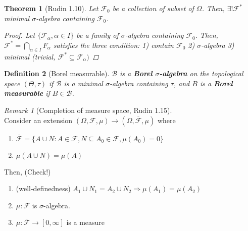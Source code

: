 \documentclass[12pt]{report}
\renewcommand{\1}{\mathbb{1}}
\renewcommand{\subset}{\subseteq}
\theoremstyle{break}
\newtheorem{thm}{Theorem}[section] %
\theoremstyle{newdef}
\newtheorem{defn}[thm]{Definition} %
\theoremstyle{remark}
\newtheorem*{rem}{Remark} %
\begin{document}
\begin{thm}[Rudin 1.10]
Let $\mathcal{F}_0$ be a collection of subset of $\Omega$.
Then, $\exists! \mathcal{F}^*$ minimal $\sigma$-algebra containing $\mathcal F_0$.

\begin{proof}
Let $\{\mathcal{F}_\alpha, \alpha \in I\}$ be a family of $\sigma$-algebra containing $\mathcal{F}_0$.
Then, $\mathcal{F}^* = \bigcap_{\alpha\in I} F_\alpha$ satisfies the three condition:
1) contain $\mathcal{F}_0$
2) $\sigma$-algebra
3) minimal (trivial, $\mathcal{F}^* \subset \mathcal{F}_\alpha)$
\end{proof}
\end{thm}


\begin{defn}[Borel measurable]
$\mathcal{B}$ is a \textbf{Borel $\sigma$-algebra} on the topological space $(\Theta,\tau)$ if
$\mathcal{B}$ is a minimal $\sigma$-algebra containing $\tau$, and $B$ is a \textbf{Borel measurable} if $B \in \mathcal{B}$.
\end{defn}

\begin{rem}[Completion of measure space, Rudin 1.15]
\leavevmode\\
Consider an extension $(\Omega, \mathcal{F}, \mu) \rightarrow (\Omega, \overline{\mathcal{F}}, \mu)$ where
\begin{enumerate}
\item $\overline{\mathcal{F}} = \{ A \cup N : A \in \mathcal{F}, N \subset A_0 \in \mathcal{F}, \mu(A_0) = 0 \}$
\item $\mu(A \cup N) = \mu(A)$
\end{enumerate}
Then, (Check!)
\begin{enumerate}
\item (well-definedness) $A_1 \cup N_1 = A_2 \cup N_2 \Rightarrow \mu(A_1) = \mu(A_2)$
\item $\mu: \overline{\mathcal{F}}$ is $\sigma$-algebra.
\item $\mu : \overline{\mathcal{F}} \rightarrow [0,\infty]$ is a measure
\end{enumerate}
\end{rem}
\end{document}
